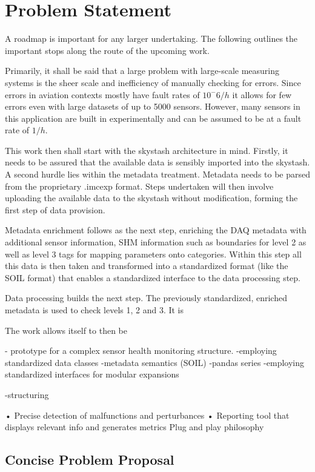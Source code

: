 \chapter{Problem Statement}

A roadmap is important for any larger undertaking. The following outlines the important stops along the route of the upcoming work.

Primarily, it shall be said that a large problem with large-scale measuring systems is the sheer scale and inefficiency of manually checking for errors. Since errors in aviation contexts mostly have fault rates of $10^-6/h$ it allows for few errors even with large datasets of up to 5000 sensors. However, many sensors in this application are built in experimentally and can be assumed to be at a fault rate of $1/h$.

This work then shall start with the skystash architecture in mind. Firstly, it needs to be assured that the available data is sensibly imported into the skystash. A second hurdle lies within the metadata treatment. Metadata needs to be parsed from the proprietary .imcexp format. Steps undertaken will then involve uploading the available data to the skystash without modification, forming the first step of data provision.

Metadata enrichment follows as the next step, enriching the DAQ metadata with additional sensor information, SHM information such as boundaries for level 2 as well as level 3 tags for mapping parameters onto categories. Within this step all this data is then taken and transformed into a standardized format (like the SOIL format) that enables a standardized interface to the data processing step.

Data processing builds the next step. The previously standardized, enriched metadata is used to check levels 1, 2 and 3. It is

The work allows itself to then be

- prototype for a complex sensor health monitoring structure.
    -employing standardized data classes
        -metadata semantics (SOIL)
        -pandas series
    -employing standardized interfaces for modular expansions

-structuring

	• Precise detection of malfunctions and perturbances
	• Reporting tool that displays relevant info and generates metrics
Plug and play philosophy


\section{Concise Problem Proposal}

